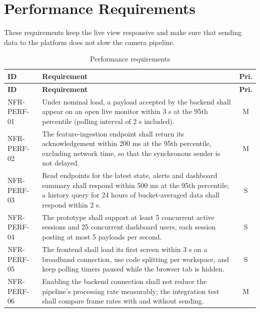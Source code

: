 \documentclass[a4paper,11pt]{scrreprt}
\makeatletter
\newenvironment{reqtable}[1]{%
  \small
  \begin{longtable}{@{}>{\ttfamily\footnotesize}p{2.55cm}>{\raggedright\arraybackslash}p{10.7cm}c@{}}
  \caption{#1}\\
  \toprule \textbf{ID} & \textbf{Requirement} & \textbf{Pri.}\\ \midrule
  \endfirsthead
  \toprule \textbf{ID} & \textbf{Requirement} & \textbf{Pri.}\\ \midrule
  \endhead
  \bottomrule
  \endfoot
}{%
  \end{longtable}\normalsize
}
\newcommand{\req}[3]{#1 & #2 & #3 \\ \midrule}
\makeatother
\begin{document}
\section{Performance Requirements}
These requirements keep the live view responsive and make sure that sending data to the platform does not slow the camera pipeline.
\begin{reqtable}{Performance requirements}
\req{NFR-PERF-01}{Under nominal load, a payload accepted by the backend shall appear on an open live monitor within 3 s at the 95th percentile (polling interval of 2 s included).}{M}
\req{NFR-PERF-02}{The feature-ingestion endpoint shall return its acknowledgement within 200 ms at the 95th percentile, excluding network time, so that the synchronous sender is not delayed.}{M}
\req{NFR-PERF-03}{Read endpoints for the latest state, alerts and dashboard summary shall respond within 500 ms at the 95th percentile; a history query for 24 hours of bucket-averaged data shall respond within 2 s.}{S}
\req{NFR-PERF-04}{The prototype shall support at least 5 concurrent active sessions and 25 concurrent dashboard users, each session posting at most 5 payloads per second.}{S}
\req{NFR-PERF-05}{The frontend shall load its first screen within 3 s on a broadband connection, use code splitting per workspace, and keep polling timers paused while the browser tab is hidden.}{S}
\req{NFR-PERF-06}{Enabling the backend connection shall not reduce the pipeline's processing rate measurably; the integration test shall compare frame rates with and without sending.}{M}
\end{reqtable}
\end{document}
